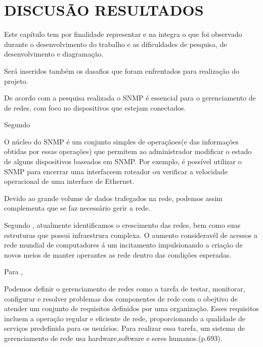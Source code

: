 
\chapter{DISCUSÃO RESULTADOS} 

\par Este capítulo tem por finalidade representar e na integra o que foi
observado durante o desenvolvimento do trabalho e as dificuldades de pesquisa,
de desenvolvimento e diagramação.

\par Será inseridos também os dasafios que foram enfrentados para realização do
projeto.


\par De acordo com a pesquisa realizada o SNMP é essencial para o gerenciamento
de de redes, com foco no dispositivos que estejam conectados.

Segundo 

\begin{citacao}
	O núcleo do SNMP é um conjunto simples de operaçãoes(e das informações obtidas
	por essas operações) que permitem ao administrador modificar o estado de alguns
	dispositivos baseados em SNMP. Por exemplo, é possível utilizar o SNMP para
	encerrar uma interfaceem roteador ou verificar a velocidade operacional de uma
	interface de Ethernet.
\end{citacao}


\par Devido ao grande volume de dados trafegados na rede, podemos assim complementa
que se faz necessário gerir a rede.

\par Segundo , atualmente identificamos o crescimento das redes, bem como
suas estruturas que possui infraestrura complexa. O aumento consideravél de acessos a rede
mundial de computadores á um incitamento impulsionando a criação de novos meios de manter
operantes as rede dentro das condições esperadas.

\par Para ,

\begin{citacao}
	Podemos definir o gerenciamento de redes como a tarefa de testar, monitorar,
	configurar e resolver problemas dos componentes de rede com o obejtivo
	de atender um conjunto de requisitos definidos por uma organização. Esses
	requisitos incluem a operação regular e eficiente de rede, proporcionando a
	qualidade de serviços predefinida para os usuários. Para realizar essa tarefa,
	um sistema de gerenciamento de rede usa hardware,software e seres humanos.(p.693).
\end{citacao}

